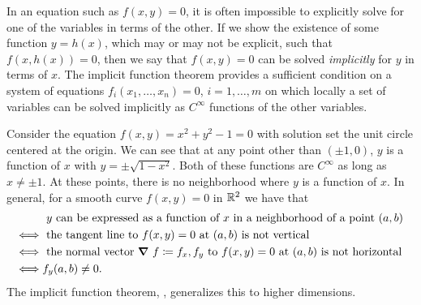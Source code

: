 \documentclass[letterpaper, 11pt, oneside]{book}
\begin{document}
In an equation such as $f(x, y) = 0$, it is often impossible to explicitly solve for one of the variables in terms of the other.
If we show the existence of some function $y = h(x)$, which may or may not be explicit, such that $f(x, h(x)) = 0$, then we say that $f(x, y) = 0$ can be solved \emph{implicitly} for $y$ in terms of $x$.
The implicit function theorem provides a sufficient condition on a system of equations $f_{i}(x_{1}, \ldots, x_{n}) = 0$, $i = 1, \ldots, m$ on which locally a set of variables can be solved implicitly as $C^{\infty}$ functions of the other variables.

\clearpage

\begin{ex}
  Consider the equation $f(x, y) = x^{2} + y^{2} - 1 = 0$ with solution set the unit circle centered at the origin.
  We can see that at any point other than $(\pm 1, 0)$, $y$ is a function of $x$ with $y = \pm \sqrt{1 - x^{2}}$.
  Both of these functions are $C^{\infty}$ as long as $x \neq \pm 1$.
  At these points, there is no neighborhood where $y$ is a function of $x$.
  In general, for a smooth curve $f(x, y) = 0$ in $\mathbb{R}^{2}$ we have that
  \begin{align*}
         & \text{ $y$ can be expressed as a function of $x$ in a neighborhood of a point $(a, b)$} \\
    \iff & \text{ the tangent line to } f(x, y) = 0 \text{ at } (a, b) \text{ is not vertical } \\
    \iff & \text{ the normal vector } \grad\ f \defeq \gen{f_{x}, f_{y}} \text{ to } f(x, y) = 0 \text{ at } (a, b) \text{ is not horizontal } \\
    \iff & f_{y}(a, b) \neq 0.
  \end{align*}
  The implicit function theorem, , generalizes this to higher dimensions.
\end{ex}
\end{document}
